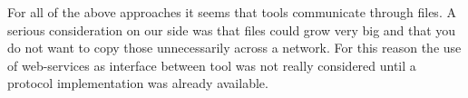 \documentclass{article}
\begin{document}
  For all of the above approaches it seems that tools communicate through
  files.  A serious consideration on our side was that files could grow very
  big and that you do not want to copy those unnecessarily across a network.
  For this reason the use of web-services as interface between tool was not
  really considered until a protocol implementation was already available.

   
   


\end{document}
